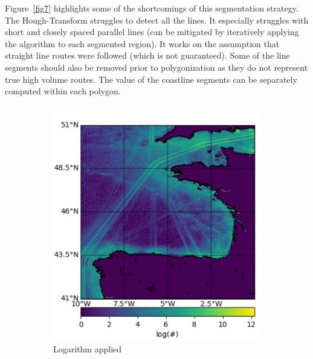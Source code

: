 \documentclass{article}
\begin{document}
Figure~\ref{fig7} highlights some of the shortcomings of this segmentation strategy. The Hough-Transform struggles to detect all 
the lines. It especially struggles with short and closely spaced parallel lines (can be mitigated by iteratively applying the algorithm to each segmented region). It works on the assumption that straight line routes were followed (which is not guaranteed). Some of the line segments should also be removed prior to polygonization as they do not 
represent true high volume routes. The value of the coastline segments can be separately computed within each polygon.
 
\begin{figure}[ht] 
  \begin{subfigure}[b]{0.5\linewidth}
    \centering
    \includegraphics[width=0.8\linewidth]{CELTICcrop.pdf} 
    \caption{Logarithm applied} 
    \label{fig7:a} 
    \vspace{4ex}
  \end{subfigure}%
  \begin{subfigure}[b]{0.5\linewidth}
    \centering

\end{subfigure}
\end{figure}
\end{document}
